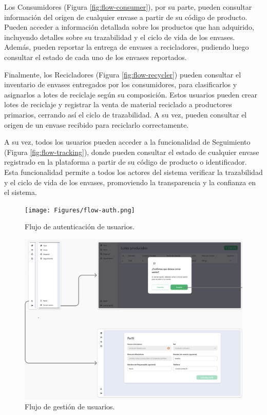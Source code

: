 Los Consumidores (Figura \ref{fig:flow-consumer}), por su parte, pueden consultar información del origen de cualquier envase a partir de su código de producto. Pueden acceder a información detallada sobre los productos que han adquirido, incluyendo detalles sobre su trazabilidad y el ciclo de vida de los envases. Además, pueden reportar la entrega de envases a recicladores, pudiendo luego consultar el estado de cada uno de los envases reportados.

Finalmente, los Recicladores (Figura \ref{fig:flow-recycler}) pueden consultar el inventario de envases entregados por los consumidores, para clasificarlos y asignarlos a lotes de reciclaje según su composición. Estos usuarios pueden crear lotes de reciclaje y registrar la venta de material reciclado a productores primarios, cerrando así el ciclo de trazabilidad. A su vez, pueden consultar el origen de un envase recibido para reciclarlo correctamente.

A su vez, todos los usuarios pueden acceder a la funcionalidad de Seguimiento (Figura \ref{fig:flow-tracking}), donde pueden consultar el estado de cualquier envase registrado en la plataforma a partir de su código de producto o identificador. Esta funcionalidad permite a todos los actores del sistema verificar la trazabilidad y el ciclo de vida de los envases, promoviendo la transparencia y la confianza en el sistema.

\begin{figure}[!htb]
	\centering
	\texttt{[image: Figures/flow-auth.png]}
	\caption{Flujo de autenticación de usuarios.}
  \label{fig:flow-auth}
\end{figure}

\begin{figure}[!htb]
	\centering
	\includegraphics[width=\linewidth]{Figures/flow-user.png}
	\caption{Flujo de gestión de usuarios.}
  \label{fig:flow-user}
\end{figure}

